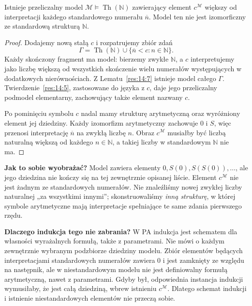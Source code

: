 \begin{stwierdzenie}\label{res:15:1}
Istnieje przeliczalny model $\mathcal M\models\operatorname{Th}(\mathbb N)$ zawierający element $c^{\mathcal M}$ większy od interpretacji każdego standardowego numerału $\overline n$. Model ten nie jest izomorficzny ze standardową strukturą $\mathbb N$.
\end{stwierdzenie}
\begin{proof}
Dodajemy nową stałą $c$ i rozpatrujemy zbiór zdań
\[
\Gamma=\operatorname{Th}(\mathbb N)\cup\{\overline n<c:n\in\mathbb N\}.
\]
Każdy skończony fragment ma model: bierzemy zwykłe $\mathbb N$, a $c$ interpretujemy jako liczbę większą od wszystkich skończenie wielu numerałów występujących w dodatkowych nierównościach. Z Lematu~\ref{res:14:7} istnieje model całego $\Gamma$. Twierdzenie~\ref{res:14:5}, zastosowane do języka z $c$, daje jego przeliczalny podmodel elementarny, zachowujący także element nazwany $c$.

Po pominięciu symbolu $c$ nadal mamy strukturę arytmetyczną oraz wyróżniony element jej dziedziny. Każdy izomorfizm arytmetyczny zachowuje $0$ i $S$, więc przenosi interpretację $\overline n$ na zwykłą liczbę $n$. Obraz $c^{\mathcal M}$ musiałby być liczbą naturalną większą od każdego $n\in\mathbb N$, a takiej liczby w standardowym $\mathbb N$ nie ma.
\end{proof}

\textbf{Jak to sobie wyobrażać?} Model zawiera elementy $0,S(0),S(S(0)),\ldots$, ale jego dziedzina nie kończy się na tej zewnętrznie opisanej liście. Element $c^{\mathcal M}$ nie jest żadnym ze standardowych numerałów. Nie znaleźliśmy nowej zwykłej liczby naturalnej „za wszystkimi innymi”; skonstruowaliśmy \emph{inną strukturę}, w której symbole arytmetyczne mają interpretacje spełniające te same zdania pierwszego rzędu.

\textbf{Dlaczego indukcja tego nie zabrania?} W PA indukcja jest schematem dla własności wyrażalnych formułą, także z parametrami. Nie mówi o każdym zewnętrznie wybranym podzbiorze dziedziny modelu. Zbiór elementów będących interpretacjami standardowych numerałów zawiera $0$ i jest zamknięty ze względu na następnik, ale w niestandardowym modelu nie jest definiowalny formułą arytmetyczną, nawet z parametrami. Gdyby był, odpowiednia instancja indukcji wymusiłaby, że jest całą dziedziną, wbrew istnieniu $c^{\mathcal M}$. Dlatego schemat indukcji i istnienie niestandardowych elementów nie przeczą sobie.

